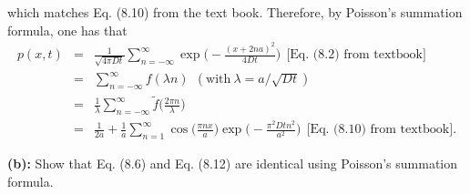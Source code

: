 which matches Eq. (8.10) from the text book. Therefore, by Poisson's summation formula, one has that
\begin{eqnarray}
p(x,t) &=& \boxed{\frac{1}{\sqrt{4 \pi D t}} \sum_{n=-\infty}^{\infty} \exp \bigg( -\frac{(x+2na)^2}{4Dt} \bigg)} ~~\text{[Eq. (8.2) from textbook]}  \nonumber  \\
&=& \sum_{n=-\infty}^{\infty} f(\lambda n)~~(\text{with}~\lambda = a/\sqrt{Dt}) \nonumber \\ 
&=& \frac{1}{\lambda} \sum_{n=-\infty}^{\infty} \tilde{f}\bigg(\frac{2 \pi n}{\lambda}\bigg) \nonumber \\
&=& \boxed{\frac{1}{2a} + \frac{1}{a} \sum_{n=1}^{\infty} \cos\bigg( \frac{ \pi nx}{a} \bigg) \exp \bigg( - \frac{ \pi^2 D t n^2}{a^2}\bigg)}~~\text{[Eq. (8.10) from textbook]}. \nonumber 
\end{eqnarray}




\textbf{(b):} Show that Eq. (8.6) and Eq. (8.12) are identical using Poisson's summation formula.

